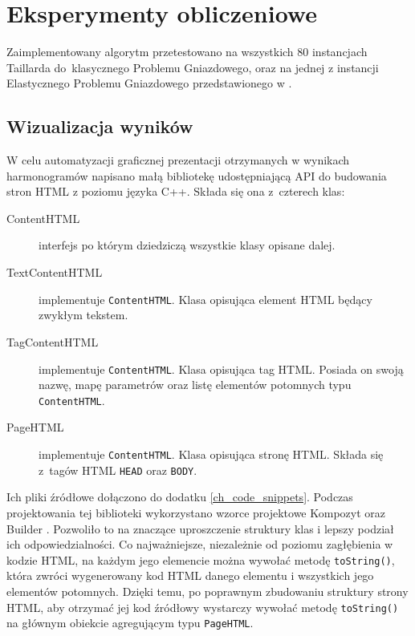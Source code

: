 \documentclass[printmode,oneside]{mgr}
\begin{document}
\chapter{Eksperymenty obliczeniowe \label{ch_experiments}}
Zaimplementowany algorytm przetestowano na wszystkich 80 instancjach Taillarda do~klasycznego Problemu Gniazdowego, oraz na jednej z instancji Elastycznego Problemu Gniazdowego przedstawionego w \cite{Kacem2002a}.

\section{Wizualizacja wyników}
W celu automatyzacji graficznej prezentacji otrzymanych w wynikach harmonogramów napisano małą bibliotekę udostępniającą API do budowania stron HTML z poziomu języka C++. Składa się ona z~czterech klas:
\begin{description}
    \item [ContentHTML] interfejs po którym dziedziczą wszystkie klasy opisane dalej.
    \item [TextContentHTML] implementuje \texttt{ContentHTML}. Klasa opisująca element HTML będący zwykłym tekstem.
    \item [TagContentHTML] implementuje \texttt{ContentHTML}. Klasa opisująca tag HTML. Posiada on swoją nazwę, mapę parametrów oraz listę  elementów potomnych typu \texttt{ContentHTML}.
    \item [PageHTML] implementuje \texttt{ContentHTML}. Klasa opisująca stronę HTML. Składa się z~tagów HTML \texttt{HEAD} oraz \texttt{BODY}.
\end{description}
Ich pliki źródłowe dołączono do dodatku \ref{ch_code_snippets}. Podczas projektowania tej biblioteki wykorzystano wzorce projektowe Kompozyt oraz Builder \cite{GangOfFour}. Pozwoliło to na znaczące uproszczenie struktury klas i lepszy podział ich odpowiedzialności. Co najważniejsze, niezależnie od poziomu zagłębienia w kodzie HTML, na każdym jego elemencie można wywołać metodę \texttt{toString()}, która zwróci wygenerowany kod HTML danego elementu i wszystkich jego elementów potomnych. Dzięki temu, po poprawnym zbudowaniu struktury strony HTML, aby otrzymać jej kod źródłowy wystarczy wywołać metodę \texttt{toString()} na głównym obiekcie agregującym typu \texttt{PageHTML}.
%
\end{document}

